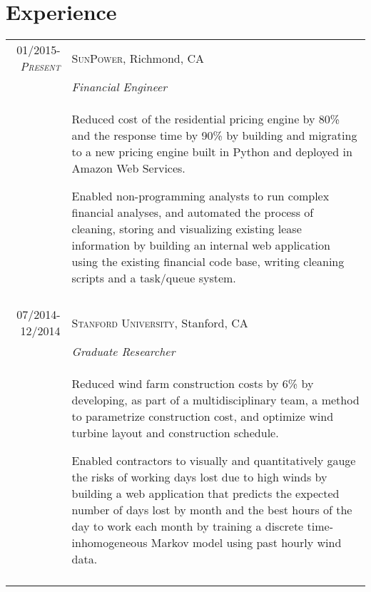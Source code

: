 \documentclass[a4paper,10pt]{article}
\begin{document}
\section{Experience}
\begin{tabularx}{\textwidth}{r|X}

\textsc{01/2015-\emph{Present} } &  \textsc{SunPower}, Richmond, CA \\&\emph{Financial Engineer}\\&\footnotesize{Reduced cost of the residential pricing engine by 80\% and the response time by 90\% by building and migrating to a new pricing engine built in Python and deployed in Amazon Web Services.

Enabled non-programming analysts to run complex financial analyses, and automated the process of cleaning, storing and visualizing existing lease information by building an internal web application using the existing financial code base, writing cleaning scripts and a task/queue system.}\\\multicolumn{2}{c}{} \\

\textsc{07/2014-12/2014} &  \textsc{Stanford University}, Stanford, CA \\&\emph{Graduate Researcher}\\&\footnotesize{
Reduced wind farm construction costs by 6\% by developing, as part of a multidisciplinary team, a method to parametrize construction cost, and optimize wind turbine layout and construction schedule. 

Enabled contractors to visually and quantitatively gauge the risks of working days lost due to high winds by building a web application that predicts the expected number of days lost by month and the best hours of the day to work each month by training a discrete time-inhomogeneous Markov model using past hourly wind data.
}\\\multicolumn{2}{c}{} \\




\end{tabularx}
\end{document}
